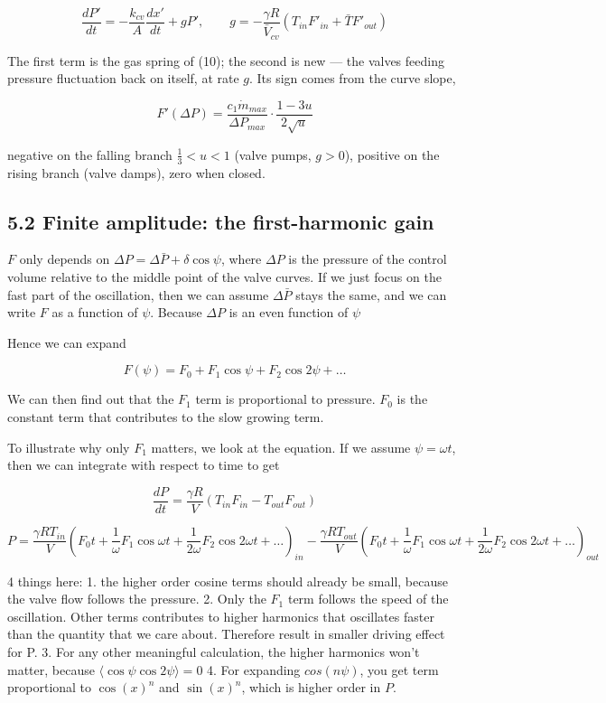 \documentclass[11pt]{article}
\begin{document}
\begin{equation}
\frac{dP'}{dt} = -\frac{k_{cv}}{A}\frac{dx'}{dt} + gP', \qquad g = -\frac{\gamma R}{\bar V_{cv}}\left(T_{in}F'_{in} + \bar TF'_{out}\right) \tag{14}
\end{equation}

The first term is the gas spring of (10); the second is new --- the valves feeding pressure fluctuation back on itself, at rate $g$. Its sign comes from the curve slope,

\begin{equation}
F'(\Delta P) = \frac{c_1\dot m_{max}}{\Delta P_{max}}\cdot\frac{1 - 3u}{2\sqrt u} \tag{15}
\end{equation}

negative on the falling branch $\frac13 < u < 1$ (valve pumps, $g > 0$), positive on the rising branch (valve damps), zero when closed.

\subsection*{5.2 Finite amplitude: the first-harmonic gain}

$F$ only depends on $\Delta P = \Delta \bar{P} + \delta \cos\psi$, where $\Delta P$ is the pressure of the control volume relative to the middle point of the valve curves. If we just focus on the fast part of the oscillation, then we can assume $ \Delta \bar{P}$ stays the same, and we can write $F$ as a function of $\psi$. Because $\Delta P$ is an even function of $\psi$

Hence we can expand

\[
F(\psi)=F_{0}+F_{1} \cos \psi+F_{2} \cos 2 \psi+\ldots
\]

We can then find out that the $F_1$ term is proportional to pressure. $F_0$ is the constant term that contributes to the slow growing term. 

To illustrate why only $F_1$ matters, we look at the equation. If we assume $\psi = \omega t$, then we can integrate with respect to time to get 

\[
\frac{d P}{d t}=\frac{\gamma R}{V}\left(T_{in} F_{in} - T_{out} F_{out}\right)
\]

\[
P = \frac{\gamma R T_{in}}{V}(F_0 t + \frac{1}{\omega} F_1 \cos \omega t + \frac{1}{2\omega} F_2 \cos 2 \omega t + \ldots)_{in} -   \frac{\gamma R T_{out}}{V} (F_0 t + \frac{1}{\omega} F_1 \cos \omega t + \frac{1}{2\omega} F_2 \cos 2 \omega t + \ldots)_{out}
\]

4 things here: 1. the higher order cosine terms should already be small, because the valve flow follows the pressure. 2. Only the $F_1$ term follows the speed of the oscillation. Other terms contributes to higher harmonics that oscillates faster than the quantity that we care about. Therefore result in smaller driving effect for P. 3.  For any other meaningful calculation, the higher harmonics won't matter, because $\langle \cos\psi \cos 2\psi \rangle = 0$ 4. For expanding $cos(n\psi)$, you get term proportional to $\cos(x)^n$ and $\sin(x)^n$, which is higher order in $P$. 
\end{document}
